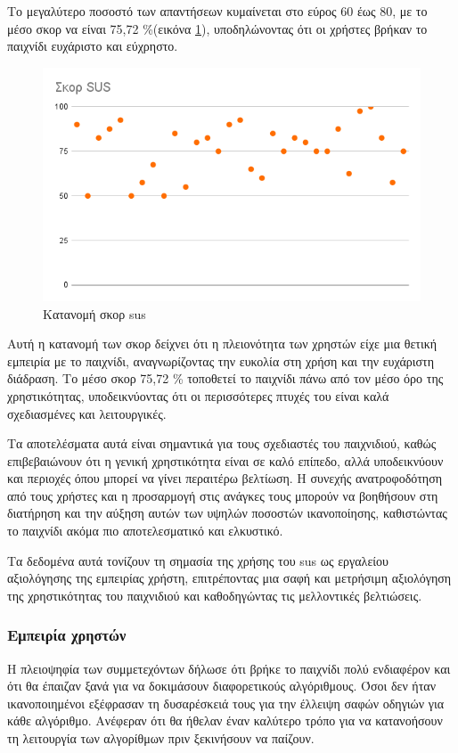 Το μεγαλύτερο ποσοστό των απαντήσεων κυμαίνεται στο εύρος 60 έως 80, με το μέσο σκορ να είναι 75,72 \%(εικόνα \ref{fig:sus_score}), υποδηλώνοντας ότι οι χρήστες βρήκαν το παιχνίδι ευχάριστο και εύχρηστο.

\begin{figure}[H]
    \centering
    \includegraphics[width=0.7\linewidth]{sections/5/2/images/sus_score}
    \caption{Κατανομή σκορ \acrshort{sus}}
    \label{fig:sus_score}
\end{figure}

Αυτή η κατανομή των σκορ δείχνει ότι η πλειονότητα των χρηστών είχε μια θετική εμπειρία με το παιχνίδι, αναγνωρίζοντας την ευκολία στη χρήση και την ευχάριστη διάδραση. Το μέσο σκορ 75,72 \% τοποθετεί το παιχνίδι πάνω από τον μέσο όρο της χρηστικότητας, υποδεικνύοντας ότι οι περισσότερες πτυχές του είναι καλά σχεδιασμένες και λειτουργικές.

Τα αποτελέσματα αυτά είναι σημαντικά για τους σχεδιαστές του παιχνιδιού, καθώς επιβεβαιώνουν ότι η γενική χρηστικότητα είναι σε καλό επίπεδο, αλλά υποδεικνύουν και περιοχές όπου μπορεί να γίνει περαιτέρω βελτίωση. Η συνεχής ανατροφοδότηση από τους χρήστες και η προσαρμογή στις ανάγκες τους μπορούν να βοηθήσουν στη διατήρηση και την αύξηση αυτών των υψηλών ποσοστών ικανοποίησης, καθιστώντας το παιχνίδι ακόμα πιο αποτελεσματικό και ελκυστικό.

Τα δεδομένα αυτά τονίζουν τη σημασία της χρήσης του \acrshort{sus} ως εργαλείου αξιολόγησης της εμπειρίας χρήστη, επιτρέποντας μια σαφή και μετρήσιμη αξιολόγηση της χρηστικότητας του παιχνιδιού και καθοδηγώντας τις μελλοντικές βελτιώσεις.


\subsubsection{Εμπειρία χρηστών}

Η πλειοψηφία των συμμετεχόντων δήλωσε ότι βρήκε το παιχνίδι πολύ ενδιαφέρον και ότι θα έπαιζαν ξανά για να δοκιμάσουν διαφορετικούς αλγόριθμους. Όσοι δεν ήταν ικανοποιημένοι εξέφρασαν τη δυσαρέσκειά τους για την έλλειψη σαφών οδηγιών για κάθε αλγόριθμο. Ανέφεραν ότι θα ήθελαν έναν καλύτερο τρόπο για να κατανοήσουν τη λειτουργία των αλγορίθμων πριν ξεκινήσουν να παίζουν.

